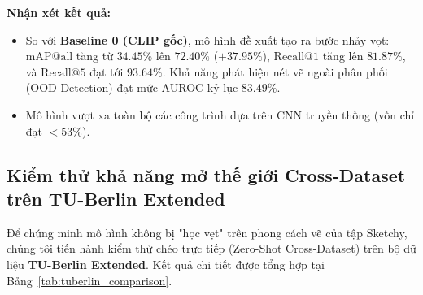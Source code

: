 \documentclass[12pt,a4paper]{report}
\begin{document}
\textbf{Nhận xét kết quả:}
\begin{itemize}[leftmargin=*]
    \item So với \textbf{Baseline 0 (CLIP gốc)}, mô hình đề xuất tạo ra bước nhảy vọt: $\text{mAP@all}$ tăng từ $34.45\%$ lên \textbf{$72.40\%$} ($+37.95\%$), $\text{Recall@1}$ tăng lên \textbf{$81.87\%$}, và $\text{Recall@5}$ đạt tới \textbf{$93.64\%$}. Khả năng phát hiện nét vẽ ngoài phân phối (OOD Detection) đạt mức AUROC kỷ lục \textbf{$83.49\%$}.
    \item Mô hình vượt xa toàn bộ các công trình dựa trên CNN truyền thống (vốn chỉ đạt $< 53\%$).
\end{itemize}

\subsection{Kiểm thử khả năng mở thế giới Cross-Dataset trên TU-Berlin Extended}
Để chứng minh mô hình không bị "học vẹt" trên phong cách vẽ của tập Sketchy, chúng tôi tiến hành kiểm thử chéo trực tiếp (Zero-Shot Cross-Dataset) trên bộ dữ liệu \textbf{TU-Berlin Extended}. Kết quả chi tiết được tổng hợp tại Bảng~\ref{tab:tuberlin_comparison}.

\begin{table}[H]
    \centering
    \caption{Kết quả kiểm thử chéo Zero-Shot Cross-Dataset trên tập dữ liệu TU-Berlin Extended.}
    \label{tab:tuberlin_comparison}
    \small
    \setlength{\tabcolsep}{5pt}
\end{table}
\end{document}
